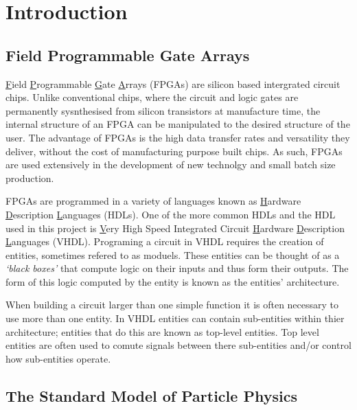\section{Introduction}

  \subsection{Field Programmable Gate Arrays}

    \underline{F}ield \underline{P}rogrammable \underline{G}ate \underline{A}rrays (FPGAs) are silicon based intergrated circuit chips.
    Unlike conventional chips, where the circuit and logic gates are permanently sysnthesised from silicon transistors at manufacture time, the internal structure of an FPGA can be manipulated to the desired structure of the user.
    The advantage of FPGAs is the high data transfer rates and versatility they deliver, without the cost of manufacturing purpose built chips. 
    As such, FPGAs are used extensively in the development of new technolgy and small batch size production. \cite{fpga}
    \par
    FPGAs are programmed in a variety of languages known as \underline{H}ardware \underline{D}escription \underline{L}anguages (HDLs).
    One of the more common HDLs and the HDL used in this project is \underline{V}ery High Speed Integrated Circuit \underline{H}ardware \underline{D}escription \underline{L}anguages (VHDL).
    Programing a circuit in VHDL requires the creation of entities, sometimes refered to as moduels.
    These entities can be thought of as a \textit{`black boxes'} that compute logic on their inputs and thus form their outputs.
    The form of this logic computed by the entity is known as the entities' architecture.
    \par
    When building a circuit larger than one simple function it is often necessary to use more than one entity.
    In VHDL entities can contain sub-entities within thier architecture; entities that do this are known as top-level entities.
    Top level entities are often used to comute signals between there sub-entities and/or control how sub-entities operate.

	\subsection{The Standard Model of Particle Physics}

